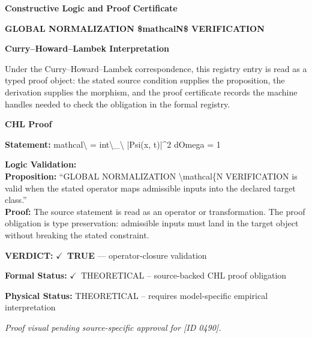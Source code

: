 \clearpage
\begingroup\tzpsupportsetup
\noindent\textbf{\fontsize{10.8pt}{12.8pt}\selectfont [ID 0490] Constructive Logic and Proof Certificate}\par
\noindent\textbf{\fontsize{10pt}{12pt}\selectfont GLOBAL NORMALIZATION \$mathcalN\$ VERIFICATION}\par
\vspace{0.45em}
\begingroup
\footnotesize
\setlength{\parskip}{0.22em}
\setlength{\parindent}{0pt}
\noindent\textbf{Curry--Howard--Lambek Interpretation}\par
Under the Curry--Howard--Lambek correspondence, this registry entry is read as a typed proof
object: the stated source condition supplies the proposition, the derivation supplies the
morphism, and the proof certificate records the machine handles needed to check the obligation
in the formal registry.

\vspace{0.45em}
\noindent\textbf{CHL Proof}\par
\textbf{Statement:} mathcal\textbackslash{} = int\textbackslash{}\_\textbackslash{} |Psi(x, t)|\textasciicircum{}2 dOmega = 1

\textbf{Logic Validation:}\\
\textbf{Proposition:} ``GLOBAL NORMALIZATION \textbackslash{}mathcal\{N VERIFICATION is valid when the stated operator maps
admissible inputs into the declared target class.''\\
\textbf{Proof:} The source statement is read as an operator or transformation. The proof obligation is
type preservation: admissible inputs must land in the target object without breaking the
stated constraint.

\textbf{VERDICT:} \ensuremath{\checkmark}\ \textbf{TRUE} --- operator-closure validation

\textbf{Formal Status:} \ensuremath{\checkmark}\ THEORETICAL -- source-backed CHL proof obligation

\textbf{Physical Status:} THEORETICAL -- requires model-specific empirical interpretation
\par\vspace{0.45em}
\par
\vfill
\begingroup\footnotesize\itshape
Proof visual pending source-specific approval for [ID 0490].
\par\endgroup
\vfill
\endgroup
\endgroup
